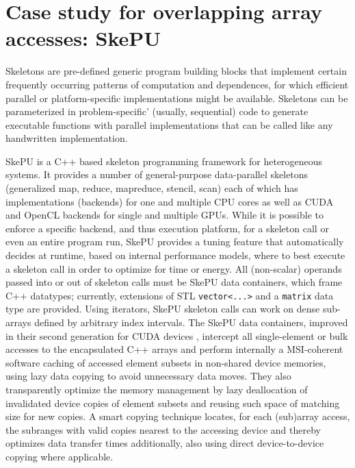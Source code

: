 \section{Case study for overlapping array accesses: SkePU}

Skeletons are pre-defined generic program building blocks
that implement certain frequently occurring patterns of
computation and dependences, for which efficient parallel
or platform-specific implementations might be available.
Skeletons can be parameterized in problem-specific'
(usually, sequential) code to generate executable functions
with parallel implementations that can be called like
any handwritten implementation.

SkePU \cite{Enmyren10,Ernstsson18} 
is a C++ based skeleton programming framework for heterogeneous systems.
It provides a number of general-purpose data-parallel skeletons
(generalized map, reduce, mapreduce, stencil, scan) each of
which has implementations (backends) for one and multiple CPU cores as
well as CUDA and OpenCL backends for single and multiple GPUs.
While it is possible to enforce a specific backend, and thus
execution platform, for a skeleton call or even an entire program
run, SkePU provides a tuning feature that automatically 
decides at runtime,
based on internal performance models, where to best execute a 
skeleton call in order to optimize for time or energy. 
All (non-scalar) operands passed into or out of skeleton calls must be
SkePU data containers, which frame C++ datatypes;
currently, extensions of STL \texttt{vector<...>}
and a \texttt{matrix} data type are provided.
Using iterators, SkePU skeleton calls can work on dense sub-arrays
defined by arbitrary index intervals.
The SkePU data containers, improved in their second generation for
CUDA devices \cite{Dastgeer-IJPP15}, intercept all single-element
or bulk accesses to the encapsulated C++ arrays and
perform internally a MSI-coherent software caching of
accessed element subsets in non-shared device memories, 
using lazy data copying to avoid unnecessary data moves.
They also transparently optimize the memory management
by lazy deallocation of invalidated device copies of element
subsets and reusing such space of matching size for new copies.
A smart copying technique locates, for each (sub)array access, the 
subranges with valid copies nearest to the accessing device
and thereby optimizes data transfer times additionally,
also using direct device-to-device copying where applicable.


